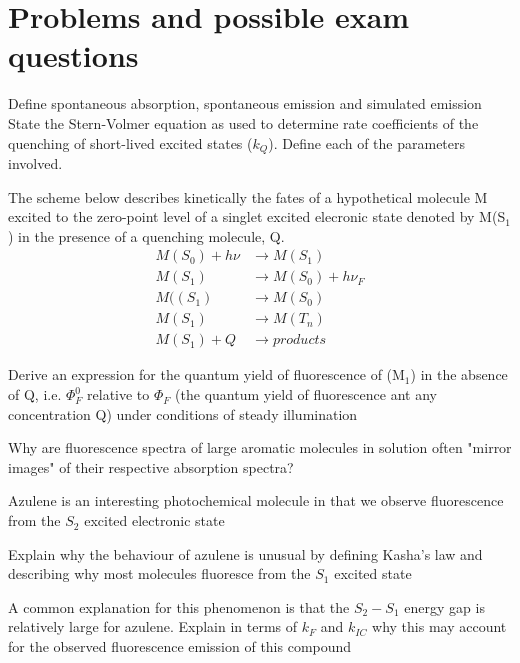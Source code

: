 \documentclass[a4paper,12pt,titlepage]{article}
\begin{document}
\section{Problems and possible exam questions}

\begin{ExerciseList}
\Exercise Define spontaneous absorption, spontaneous emission and simulated emission
State the Stern-Volmer equation as used to determine rate coefficients of the quenching of short-lived excited states (\(k_Q\)). Define each of the parameters involved.

\Exercise The scheme below describes kinetically the fates of a hypothetical molecule M excited to the zero-point level of a singlet excited elecronic state denoted by M(S\(_1\)) in the presence of a quenching molecule, Q.
\begin{align*}
M(S_0) + h\nu &\rightarrow M(S_1)\\
M(S_1) &\rightarrow M(S_0) + h\nu_F\\
M((S_1) &\rightarrow M(S_0)\\
M(S_1) &\rightarrow M(T_n)\\
M(S_1) + Q &\rightarrow products
\end{align*}

\Question Derive an expression for the quantum yield of fluorescence of (M\(_1\)) in the absence of Q, i.e. \(\Phi^0_F\) relative to \(\Phi_F\) (the quantum yield of fluorescence ant any concentration Q) under conditions of steady illumination

\Exercise Why are fluorescence spectra of large aromatic molecules in solution often "mirror images" of their respective absorption spectra?

\Exercise Azulene is an interesting photochemical molecule in that we observe fluorescence from the \(S_2\) excited electronic state

\Question Explain why the behaviour of azulene is unusual by defining Kasha's law and describing why most molecules fluoresce from the \(S_1\) excited state

\Question A common explanation for this phenomenon is that the \(S_2-S_1\) energy gap is relatively large for azulene. Explain in terms of \(k_F\) and \(k_{IC}\) why this may account for the observed fluorescence emission of this compound


\end{ExerciseList}
\end{document}
